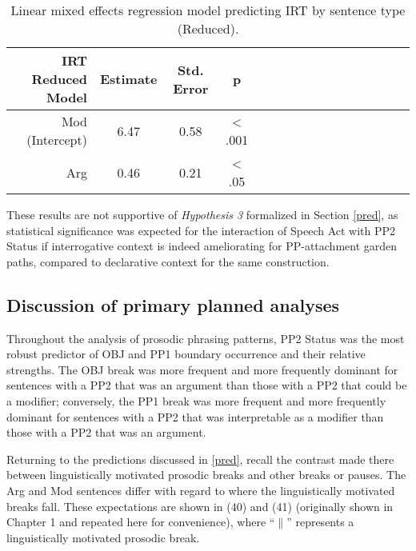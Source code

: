 \documentclass[11pt,oneside]{book}
\begin{document}
\begin{table}[!h]

\caption{\label{tab:redirt}Linear mixed effects regression model predicting IRT by sentence type (Reduced).}
\centering
\begin{tabular}{rcccrcccrcccrccc}
\toprule
IRT Reduced Model & Estimate & Std. Error & p\\
\midrule
Mod (Intercept) & 6.47 & 0.58 & < .001\\
Arg & 0.46 & 0.21 & < .05\\
\bottomrule
\end{tabular}
\end{table}

These results are not supportive of \emph{Hypothesis 3} formalized in Section \ref{pred}, as statistical significance was expected for the interaction of Speech Act with PP2 Status if interrogative context is indeed ameliorating for PP-attachment garden paths, compared to declarative context for the same construction.

\hypertarget{discussion-of-primary-planned-analyses}{%
\subsection{Discussion of primary planned analyses}\label{discussion-of-primary-planned-analyses}}

Throughout the analysis of prosodic phrasing patterns, PP2 Status was the most robust predictor of OBJ and PP1 boundary occurrence and their relative strengths. The OBJ break was more frequent and more frequently dominant for sentences with a PP2 that was an argument than those with a PP2 that could be a modifier; conversely, the PP1 break was more frequent and more frequently dominant for sentences with a PP2 that was interpretable as a modifier than those with a PP2 that was an argument.

Returning to the predictions discussed in \ref{pred}, recall the contrast made there between linguistically motivated prosodic breaks and other breaks or pauses. The Arg and Mod sentences differ with regard to where the linguistically motivated breaks fall. These expectations are shown in (40) and (41) (originally shown in Chapter 1 and repeated here for convenience), where ``\(\|\)'' represents a linguistically motivated prosodic break.

\singlespacing
\end{document}
